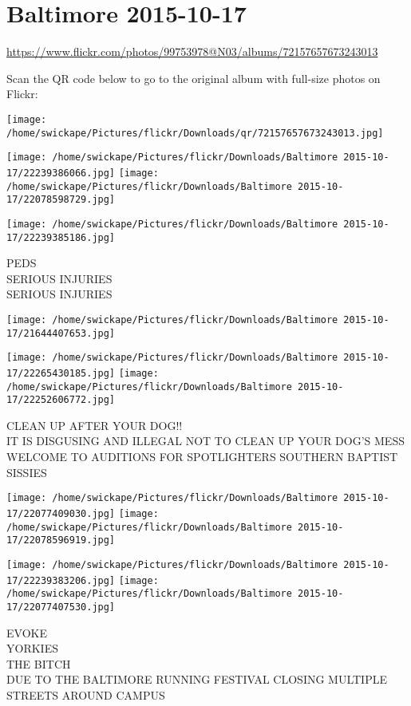\documentclass[10pt,letterpaper]{article}
\title{}
\author{}
\date{}
\begin{document}
\section*{Baltimore 2015-10-17}

\url{https://www.flickr.com/photos/99753978@N03/albums/72157657673243013}

Scan the QR code below to go to the original album with full-size photos on Flickr:

\texttt{[image: /home/swickape/Pictures/flickr/Downloads/qr/72157657673243013.jpg]}
\pagebreak

\texttt{[image: /home/swickape/Pictures/flickr/Downloads/Baltimore 2015-10-17/22239386066.jpg]}
\texttt{[image: /home/swickape/Pictures/flickr/Downloads/Baltimore 2015-10-17/22078598729.jpg]}

\texttt{[image: /home/swickape/Pictures/flickr/Downloads/Baltimore 2015-10-17/22239385186.jpg]}

PEDS\\
SERIOUS INJURIES\\
SERIOUS INJURIES
\pagebreak

\texttt{[image: /home/swickape/Pictures/flickr/Downloads/Baltimore 2015-10-17/21644407653.jpg]}

\vspace{0.25in}
\texttt{[image: /home/swickape/Pictures/flickr/Downloads/Baltimore 2015-10-17/22265430185.jpg]}
\texttt{[image: /home/swickape/Pictures/flickr/Downloads/Baltimore 2015-10-17/22252606772.jpg]}

CLEAN UP AFTER YOUR DOG!!\\
IT IS DISGUSING AND ILLEGAL NOT TO CLEAN UP YOUR DOG'S MESS\\
WELCOME TO AUDITIONS FOR SPOTLIGHTERS SOUTHERN BAPTIST SISSIES
\pagebreak

\texttt{[image: /home/swickape/Pictures/flickr/Downloads/Baltimore 2015-10-17/22077409030.jpg]}
\texttt{[image: /home/swickape/Pictures/flickr/Downloads/Baltimore 2015-10-17/22078596919.jpg]}

\texttt{[image: /home/swickape/Pictures/flickr/Downloads/Baltimore 2015-10-17/22239383206.jpg]}
\texttt{[image: /home/swickape/Pictures/flickr/Downloads/Baltimore 2015-10-17/22077407530.jpg]}

EVOKE\\
YORKIES\\
THE BITCH\\
DUE TO THE BALTIMORE RUNNING FESTIVAL CLOSING MULTIPLE STREETS AROUND CAMPUS
\pagebreak
\end{document}
